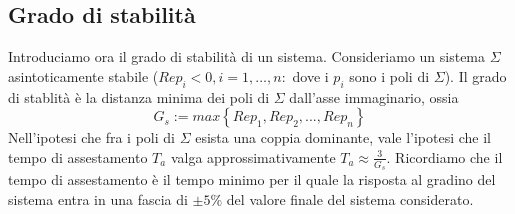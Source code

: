 \documentclass[11pt]{article}
\begin{document}
\subsection{Grado di stabilità}
Introduciamo ora il grado di stabilità di un sistema. Consideriamo un sistema $\Sigma$ asintoticamente stabile ($Re p_i <0, i=1,\dots,n:$ dove i $p_i$ sono i poli di $\Sigma$). Il grado di stablità è la distanza minima dei poli di $\Sigma$ dall'asse immaginario, ossia
\begin{displaymath}
    G_s := max\left\{Rep_1, Re p_2, ..., Re p_n\right\}
\end{displaymath}
Nell'ipotesi che fra i poli di $\Sigma$ esista una coppia dominante, vale l'ipotesi che il tempo di assestamento $T_a$ valga approssimativamente $T_a \approx \frac{3}{G_s}$. Ricordiamo che il tempo di assestamento è il tempo minimo per il quale la risposta al gradino del sistema entra in una fascia di $\pm 5\%$ del valore finale del sistema considerato. 
\end{document}

